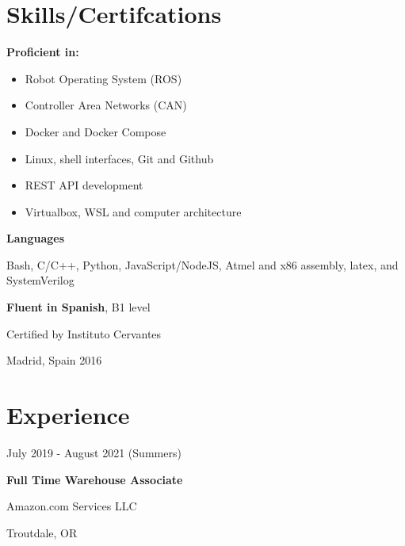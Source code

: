 \documentclass[12pt,letterpaper]{article}
\begin{document}
\begin{minipage}[t]{0.45\linewidth}


	\raggedright

		\vspace{0.5cm}
    \section*{Skills/Certifcations}

	\textbf{Proficient in:} 
	\begin{itemize}
		\item Robot Operating System (ROS)
		\item Controller Area Networks (CAN)
		\item Docker and Docker Compose
		\item Linux, shell interfaces, Git and Github
		\item REST API development
		\item Virtualbox, WSL and computer architecture
	\end{itemize}
	\vspace{0.5cm}
	
	\textbf{Languages}

	Bash, C/C++, Python, JavaScript/NodeJS, Atmel and x86 assembly, latex, and SystemVerilog
	\vspace{0.5cm}

	\textbf{Fluent in Spanish}, B1 level

	Certified by Instituto Cervantes

	Madrid, Spain 2016

    
	\section*{Experience}
	July 2019 - August 2021 (Summers)
	
	\textbf{Full Time Warehouse Associate}
	
	Amazon.com Services LLC

	Troutdale, OR
	
	\end{minipage}
\end{document}
